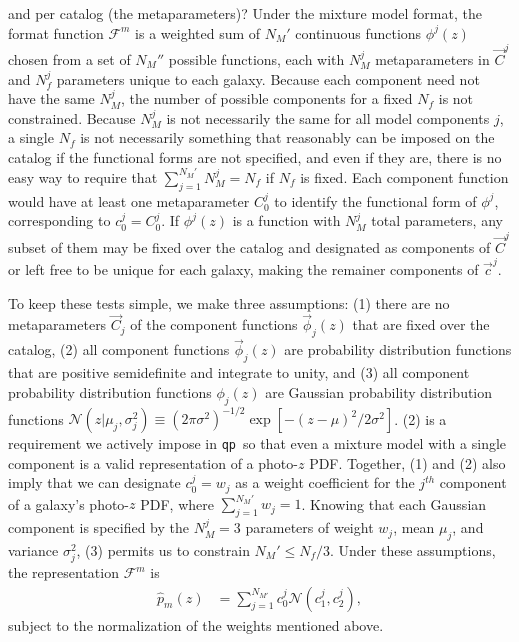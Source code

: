 \documentclass[\docopts]{\docclass}
\newcommand{\qp}{\texttt{qp}}
\newcommand{\pz}{photo-$z$ PDF}
\begin{document}
and per catalog (the metaparameters)?
Under the mixture model format, the format function $\mathcal{F}^{m}$ is a 
weighted sum of $N_{M}'$ continuous functions $\phi^{j}(z)$ chosen from a set 
of $N_{M}''$ possible functions, each with $N_{M}^{j}$ metaparameters in 
$\vec{C}^{j}$ and $N_{f}^{j}$ parameters unique to each galaxy.  Because each 
component need not have the same $N_{M}^{j}$, the number of possible components 
for a fixed $N_{f}$ is not constrained.  Because $N_{M}^{j}$ is not necessarily 
the same for all model components $j$, a single $N_{f}$ is not necessarily 
something that reasonably can be imposed on the catalog if the functional forms 
are not specified, and even if they are, there is no easy way to require that 
$\sum_{j=1}^{N_{M}'}N_{M}^{j}=N_{f}$ if $N_{f}$ is fixed.  Each component 
function would have at least one metaparameter $C_{0}^{j}$ to identify the 
functional form of $\phi^{j}$, corresponding to $c_{0}^{j}=C_{0}^{j}$.  If 
$\phi^{j}(z)$ is a function with $N_{M}^{j}$ total parameters, any subset of 
them may be fixed over the catalog and designated as components of 
$\vec{C}^{j}$ or left free to be unique for each galaxy, making the remainer 
components of $\vec{c}^{j}$.

To keep these tests simple, we make three assumptions: (1) there are no 
metaparameters $\vec{C}_{j}$ of the component functions $\vec{\phi}_{j}(z)$ 
that are fixed over the catalog, (2) all component functions 
$\vec{\phi}_{j}(z)$ are probability distribution functions that are positive 
semidefinite and integrate to unity, and (3) all component probability 
distribution functions $\phi_{j}(z)$ are Gaussian probability distribution 
functions $\mathcal{N}(z | 
\mu_{j},\sigma^{2}_{j})\equiv(2\pi\sigma^{2})^{-1/2}\exp[-(z-\mu)^{2}/2\sigma^{2
}]$.  (2) is a requirement we actively impose in \qp\ so that even a mixture 
model with a single component is a valid representation of a \pz.  Together, 
(1) and (2) also imply that we can designate $c_{0}^{j}=w_{j}$ as a weight 
coefficient for the $j^{th}$ component of a galaxy's \pz, where 
$\sum_{j=1}^{N_{M}'}w_{j}=1$.  Knowing that each Gaussian component is 
specified by the $N_{M}^{j}=3$ parameters of weight $w_{j}$, mean $\mu_{j}$, 
and variance $\sigma^{2}_{j}$, (3) permits us to constrain $N_{M}'\leq 
N_{f}/3$.  Under these assumptions, the representation $\mathcal{F}^{m}$ is
\begin{align}
  \label{eq:gmm}
  \hat{p}_{m}(z) &= \sum_{j=1}^{N_{M'}} c_{0}^{j} \mathcal{N}(c_{1}^{j}, 
c_{2}^{j}),
\end{align}
subject to the normalization of the weights mentioned above.
\end{document}
